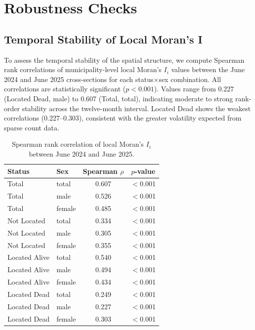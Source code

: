 \appendix

\section{Robustness Checks}
\label{app:robustness}

\subsection{Temporal Stability of Local Moran's I}

To assess the temporal stability of the spatial structure, we compute Spearman rank correlations of municipality-level local Moran's $I_i$ values between the June 2024 and June 2025 cross-sections for each status$\times$sex combination.
All correlations are statistically significant ($p < 0.001$).
Values range from 0.227 (Located Dead, male) to 0.607 (Total, total), indicating moderate to strong rank-order stability across the twelve-month interval.
Located Dead shows the weakest correlations (0.227--0.303), consistent with the greater volatility expected from sparse count data.

\begin{table}[htbp]
  \centering
  \caption{Spearman rank correlation of local Moran's $I_i$ between June 2024 and June 2025.}
  \label{tab:spearman}
  \begin{tabular}{llcc}
    \toprule
    Status & Sex & Spearman $\rho$ & $p$-value \\
    \midrule
    Total & total & 0.607 & $<$0.001 \\
    Total & male & 0.526 & $<$0.001 \\
    Total & female & 0.485 & $<$0.001 \\
    Not Located & total & 0.334 & $<$0.001 \\
    Not Located & male & 0.305 & $<$0.001 \\
    Not Located & female & 0.355 & $<$0.001 \\
    Located Alive & total & 0.540 & $<$0.001 \\
    Located Alive & male & 0.494 & $<$0.001 \\
    Located Alive & female & 0.434 & $<$0.001 \\
    Located Dead & total & 0.249 & $<$0.001 \\
    Located Dead & male & 0.227 & $<$0.001 \\
    Located Dead & female & 0.303 & $<$0.001 \\
    \bottomrule
  \end{tabular}
\end{table}

